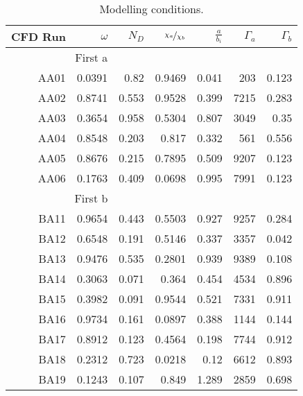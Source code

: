 \begin{table}[htbp]
  \centering
  \caption{Modelling conditions.}
  \label{tab:label}
    \begin{tabular}{|rrrrrrr|}
      \hline
    CFD Run & $\omega$     & $N_D$ & $\nicefrac{\chi_a}{\chi_b}$  & $\frac{a}{b_i}$      & $\Gamma_a$    & $\Gamma_b$ \\
    \hline
    \multicolumn{ 2}{|r}{First a} &       &       &       &       &  \\
    \hline
    AA01  & 0.0391 & 0.82  & 0.9469 & 0.041 & 203   & 0.123 \\
    AA02  & 0.8741 & 0.553 & 0.9528 & 0.399 & 7215  & 0.283 \\
    AA03  & 0.3654 & 0.958 & 0.5304 & 0.807 & 3049  & 0.35 \\
    AA04  & 0.8548 & 0.203 & 0.817 & 0.332 & 561   & 0.556 \\
    AA05  & 0.8676 & 0.215 & 0.7895 & 0.509 & 9207  & 0.123 \\
    AA06  & 0.1763 & 0.409 & 0.0698 & 0.995 & 7991  & 0.123 \\
    \hline
    \multicolumn{ 2}{|r}{First b} &       &       &       &       &  \\
    \hline
    BA11  & 0.9654 & 0.443 & 0.5503 & 0.927 & 9257  & 0.284 \\
    BA12  & 0.6548 & 0.191 & 0.5146 & 0.337 & 3357  & 0.042 \\
    BA13  & 0.9476 & 0.535 & 0.2801 & 0.939 & 9389  & 0.108 \\
    BA14  & 0.3063 & 0.071 & 0.364 & 0.454 & 4534  & 0.896 \\
    BA15  & 0.3982 & 0.091 & 0.9544 & 0.521 & 7331  & 0.911 \\
    BA16  & 0.9734 & 0.161 & 0.0897 & 0.388 & 1144  & 0.144 \\
    BA17  & 0.8912 & 0.123 & 0.4564 & 0.198 & 7744  & 0.912 \\
    BA18  & 0.2312 & 0.723 & 0.0218 & 0.12  & 6612  & 0.893 \\
    BA19  & 0.1243 & 0.107 & 0.849 & 1.289 & 2859  & 0.698 \\
    \hline
    \end{tabular}
\end{table}
